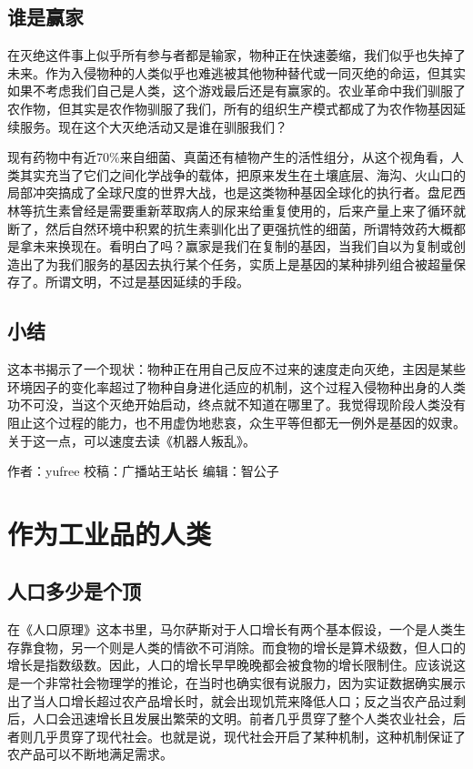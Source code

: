 \documentclass[]{book}
\begin{document}
\subsection{谁是赢家}

在灭绝这件事上似乎所有参与者都是输家，物种正在快速萎缩，我们似乎也失掉了未来。作为入侵物种的人类似乎也难逃被其他物种替代或一同灭绝的命运，但其实如果不考虑我们自己是人类，这个游戏最后还是有赢家的。农业革命中我们驯服了农作物，但其实是农作物驯服了我们，所有的组织生产模式都成了为农作物基因延续服务。现在这个大灭绝活动又是谁在驯服我们？

现有药物中有近70\%来自细菌、真菌还有植物产生的活性组分，从这个视角看，人类其实充当了它们之间化学战争的载体，把原来发生在土壤底层、海沟、火山口的局部冲突搞成了全球尺度的世界大战，也是这类物种基因全球化的执行者。盘尼西林等抗生素曾经是需要重新萃取病人的尿来给重复使用的，后来产量上来了循环就断了，然后自然环境中积累的抗生素驯化出了更强抗性的细菌，所谓特效药大概都是拿未来换现在。看明白了吗？赢家是我们在复制的基因，当我们自以为复制或创造出了为我们服务的基因去执行某个任务，实质上是基因的某种排列组合被超量保存了。所谓文明，不过是基因延续的手段。

\subsection{小结}\label{-2}

这本书揭示了一个现状：物种正在用自己反应不过来的速度走向灭绝，主因是某些环境因子的变化率超过了物种自身进化适应的机制，这个过程入侵物种出身的人类功不可没，当这个灭绝开始启动，终点就不知道在哪里了。我觉得现阶段人类没有阻止这个过程的能力，也不用虚伪地悲哀，众生平等但都无一例外是基因的奴隶。关于这一点，可以速度去读《机器人叛乱》。

作者：yufree 校稿：广播站王站长 编辑：智公子

\section{作为工业品的人类}

\subsection{人口多少是个顶}

在《人口原理》这本书里，马尔萨斯对于人口增长有两个基本假设，一个是人类生存靠食物，另一个则是人类的情欲不可消除。而食物的增长是算术级数，但人口的增长是指数级数。因此，人口的增长早早晚晚都会被食物的增长限制住。应该说这是一个非常社会物理学的推论，在当时也确实很有说服力，因为实证数据确实展示出了当人口增长超过农产品增长时，就会出现饥荒来降低人口；反之当农产品过剩后，人口会迅速增长且发展出繁荣的文明。前者几乎贯穿了整个人类农业社会，后者则几乎贯穿了现代社会。也就是说，现代社会开启了某种机制，这种机制保证了农产品可以不断地满足需求。
\end{document}
